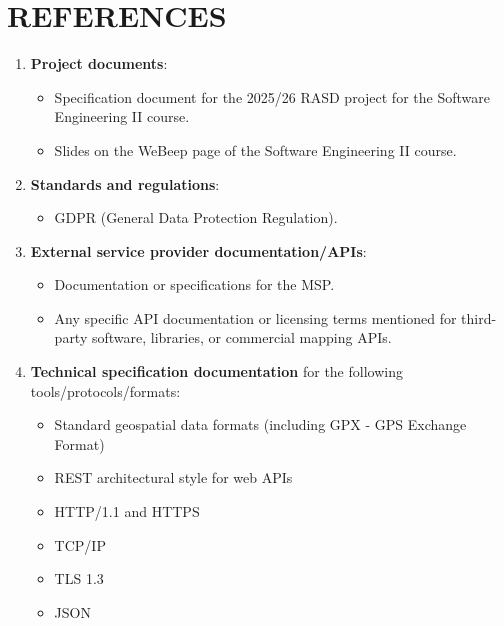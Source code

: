 \documentclass{article}
\begin{document}
\section{REFERENCES}
\begin{enumerate}
    \item \textbf{Project documents}:
        \begin{itemize}
            \item Specification document for the 2025/26 RASD project for the Software Engineering II course.
            \item Slides on the WeBeep page of the Software Engineering II course.
        \end{itemize}
    \item \textbf{Standards and regulations}:
        \begin{itemize}
            \item GDPR (General Data Protection Regulation).
        \end{itemize}
    \item \textbf{External service provider documentation/APIs}:
        \begin{itemize}
            \item Documentation or specifications for the MSP.
            \item Any specific API documentation or licensing terms mentioned for third-party software, libraries, or commercial mapping APIs.
        \end{itemize}
    \item \textbf{Technical specification documentation} for the following tools/protocols/formats:
        \begin{itemize}
            \item Standard geospatial data formats (including GPX - GPS Exchange Format)
            \item REST architectural style for web APIs
            \item HTTP/1.1 and HTTPS
            \item TCP/IP
            \item TLS 1.3
            \item JSON
        \end{itemize}
\end{enumerate}
\end{document}

